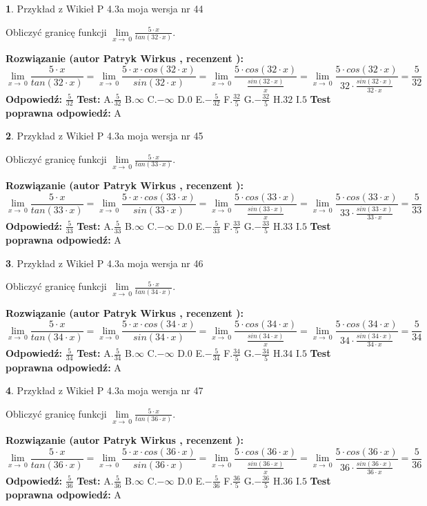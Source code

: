 \documentclass[12pt, a4paper]{article}
\theoremstyle{definition} %
\newtheorem{zad}{}
\newcommand{\zadStart}[1]{\begin{zad}#1\newline}
\newcommand{\zadStop}{\end{zad}}
\newcommand{\rozwStart}[2]{\noindent \textbf{Rozwiązanie (autor #1 , recenzent #2): }\newline}
\newcommand{\rozwStop}{\newline}
\newcommand{\odpStart}{\noindent \textbf{Odpowiedź:}\newline}
\newcommand{\odpStop}{\newline}
\newcommand{\testStart}{\noindent \textbf{Test:}\newline}
\newcommand{\testStop}{\newline}
\newcommand{\kluczStart}{\noindent \textbf{Test poprawna odpowiedź:}\newline}
\newcommand{\kluczStop}{\newline}
\begin{document}
\zadStart{Przykład z Wikieł P 4.3a moja wersja nr 44}


Obliczyć granicę funkcji $\lim\limits_{x\to\ 0}\frac{5 \cdot x}{tan(32 \cdot x)}$.
\zadStop
\rozwStart{Patryk Wirkus}{}
$$\lim\limits_{x\to\ 0}\frac{5 \cdot x}{tan(32 \cdot x)}=\lim\limits_{x\to\ 0}\frac{5 \cdot x \cdot cos(32 \cdot x)}{sin(32 \cdot x)}=\lim\limits_{x\to\ 0}\frac{5 \cdot cos(32 \cdot x)}{\frac{sin(32 \cdot x)}{x}}=\lim\limits_{x\to\ 0}\frac{5 \cdot cos(32 \cdot x)}{32 \cdot \frac{sin(32 \cdot x)}{32 \cdot x}} = \frac{5}{32}$$
\rozwStop
\odpStart
$\frac{5}{32}$
\odpStop
\testStart
A.$\frac{5}{32}$
B.$\infty$
C.$-\infty$
D.$0$
E.$-\frac{5}{32}$
F.$\frac{32}{5}$
G.$-\frac{32}{5}$
H.$32$
I.$5$
\testStop
\kluczStart
A
\kluczStop



\zadStart{Przykład z Wikieł P 4.3a moja wersja nr 45}


Obliczyć granicę funkcji $\lim\limits_{x\to\ 0}\frac{5 \cdot x}{tan(33 \cdot x)}$.
\zadStop
\rozwStart{Patryk Wirkus}{}
$$\lim\limits_{x\to\ 0}\frac{5 \cdot x}{tan(33 \cdot x)}=\lim\limits_{x\to\ 0}\frac{5 \cdot x \cdot cos(33 \cdot x)}{sin(33 \cdot x)}=\lim\limits_{x\to\ 0}\frac{5 \cdot cos(33 \cdot x)}{\frac{sin(33 \cdot x)}{x}}=\lim\limits_{x\to\ 0}\frac{5 \cdot cos(33 \cdot x)}{33 \cdot \frac{sin(33 \cdot x)}{33 \cdot x}} = \frac{5}{33}$$
\rozwStop
\odpStart
$\frac{5}{33}$
\odpStop
\testStart
A.$\frac{5}{33}$
B.$\infty$
C.$-\infty$
D.$0$
E.$-\frac{5}{33}$
F.$\frac{33}{5}$
G.$-\frac{33}{5}$
H.$33$
I.$5$
\testStop
\kluczStart
A
\kluczStop



\zadStart{Przykład z Wikieł P 4.3a moja wersja nr 46}


Obliczyć granicę funkcji $\lim\limits_{x\to\ 0}\frac{5 \cdot x}{tan(34 \cdot x)}$.
\zadStop
\rozwStart{Patryk Wirkus}{}
$$\lim\limits_{x\to\ 0}\frac{5 \cdot x}{tan(34 \cdot x)}=\lim\limits_{x\to\ 0}\frac{5 \cdot x \cdot cos(34 \cdot x)}{sin(34 \cdot x)}=\lim\limits_{x\to\ 0}\frac{5 \cdot cos(34 \cdot x)}{\frac{sin(34 \cdot x)}{x}}=\lim\limits_{x\to\ 0}\frac{5 \cdot cos(34 \cdot x)}{34 \cdot \frac{sin(34 \cdot x)}{34 \cdot x}} = \frac{5}{34}$$
\rozwStop
\odpStart
$\frac{5}{34}$
\odpStop
\testStart
A.$\frac{5}{34}$
B.$\infty$
C.$-\infty$
D.$0$
E.$-\frac{5}{34}$
F.$\frac{34}{5}$
G.$-\frac{34}{5}$
H.$34$
I.$5$
\testStop
\kluczStart
A
\kluczStop



\zadStart{Przykład z Wikieł P 4.3a moja wersja nr 47}


Obliczyć granicę funkcji $\lim\limits_{x\to\ 0}\frac{5 \cdot x}{tan(36 \cdot x)}$.
\zadStop
\rozwStart{Patryk Wirkus}{}
$$\lim\limits_{x\to\ 0}\frac{5 \cdot x}{tan(36 \cdot x)}=\lim\limits_{x\to\ 0}\frac{5 \cdot x \cdot cos(36 \cdot x)}{sin(36 \cdot x)}=\lim\limits_{x\to\ 0}\frac{5 \cdot cos(36 \cdot x)}{\frac{sin(36 \cdot x)}{x}}=\lim\limits_{x\to\ 0}\frac{5 \cdot cos(36 \cdot x)}{36 \cdot \frac{sin(36 \cdot x)}{36 \cdot x}} = \frac{5}{36}$$
\rozwStop
\odpStart
$\frac{5}{36}$
\odpStop
\testStart
A.$\frac{5}{36}$
B.$\infty$
C.$-\infty$
D.$0$
E.$-\frac{5}{36}$
F.$\frac{36}{5}$
G.$-\frac{36}{5}$
H.$36$
I.$5$
\testStop
\kluczStart
A
\kluczStop
\end{document}

